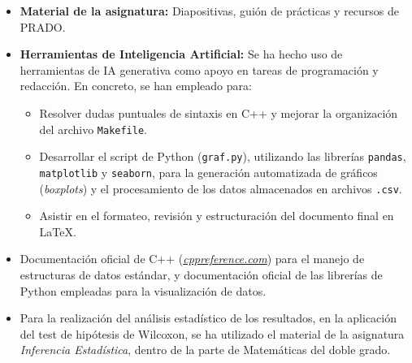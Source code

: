 \documentclass[a4paper,12pt]{article}%
\begin{document}
\begin{itemize}
	\item \textbf{Material de la asignatura:} Diapositivas, guión de prácticas y recursos de PRADO.
	
	\item \textbf{Herramientas de Inteligencia Artificial:} Se ha hecho uso de herramientas de IA generativa como apoyo en tareas de programación y redacción. En concreto, se han empleado para:
	\begin{itemize}
		\item Resolver dudas puntuales de sintaxis en C++ y mejorar la organización del archivo \texttt{Makefile}.
		\item Desarrollar el script de Python (\texttt{graf.py}), utilizando las librerías \texttt{pandas}, \texttt{matplotlib} y \texttt{seaborn}, para la generación automatizada de gráficos (\textit{boxplots}) y el procesamiento de los datos almacenados en archivos \texttt{.csv}.
		\item Asistir en el formateo, revisión y estructuración del documento final en \LaTeX.
	\end{itemize}
	
	\item Documentación oficial de C++ (\href{https://cppreference.com}{\textit{cppreference.com}}) para el manejo de estructuras de datos estándar, y documentación oficial de las librerías de Python empleadas para la visualización de datos.
	
	\item Para la realización del análisis estadístico de los resultados, en la aplicación del test de hipótesis de Wilcoxon, se ha utilizado el material de la asignatura \textit{Inferencia Estadística},  dentro de la parte de Matemáticas del doble grado.
\end{itemize}





\end{document}
